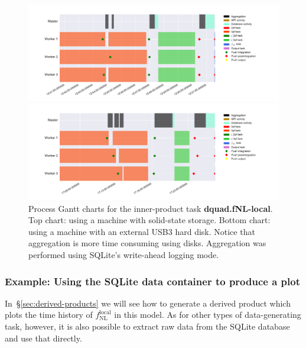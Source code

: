 \documentclass[11pt,a4paper]{article}
\newcommand{\fNL}{f_{\mathrm{NL}}}
\newcommand{\fNLlocal}{\fNL^{\text{local}}}
\newcommand{\repoobject}[1]{{\ttfamily\bfseries\small #1}}
\newcommand{\packagefont}{\sffamily}
\newcommand{\SQLite}{{\packagefont SQLite}}
\begin{document}
\begin{figure}
    \begin{center}
        \includegraphics[scale=0.5]{Outputs/gantt-fNL-arun}
    \end{center}
    \begin{center}
    	\includegraphics[scale=0.5]{Outputs/gantt-fNL-taff}	
    \end{center}

    \caption{\label{fig:gantt-fNL}Process Gantt charts for the inner-product task \repoobject{dquad.fNL-local}.
    Top chart: using a machine with solid-state storage.
    Bottom chart: using a machine with an external USB3 hard disk.
    Notice that aggregation is more time consuming using disks.
    Aggregation was performed using {\SQLite}'s write-ahead logging mode.}
\end{figure}

\subsubsection{Example: Using the {\SQLite} data container to produce a plot}
In~\S\ref{sec:derived-products}
we will see how to generate a derived product
which plots the time history of
$\fNLlocal$ in this model.
As for other types of data-generating task, however, it is also possible to extract
raw data from the {\SQLite} database
and use that directly.
\end{document}
